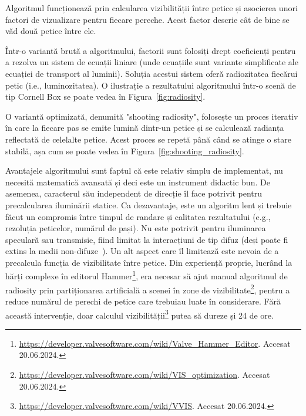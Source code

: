 \documentclass[12pt,a4paper]{report}
\numberwithin{equation}{section} %
\begin{document}
Algoritmul funcționează prin calcularea vizibilității între petice și asocierea
unori factori de vizualizare pentru fiecare pereche. Acest factor descrie
cât de bine se văd două petice între ele.

Într-o variantă brută a algoritmului, factorii sunt folosiți drept coeficienți pentru a rezolva
un sistem de ecuații liniare (unde ecuațiile sunt variante simplificate ale ecuației
de transport al luminii). Soluția acestui sistem oferă radiozitatea fiecărui petic
(i.e., luminozitatea). O ilustrație a rezultatului algoritmului într-o scenă
de tip Cornell Box se poate vedea în Figura~\ref{fig:radiosity}.

O variantă optimizată, denumită "shooting radiosity", folosește un proces iterativ în
care la fiecare pas se emite lumină dintr-un petice și se calculează radianța
reflectată de celelalte petice. Acest proces se repetă până când se atinge o stare
stabilă, așa cum se poate vedea în Figura~\ref{fig:shooting_radiosity}.

Avantajele algoritmului sunt faptul că este relativ simplu de implementat, nu necesită
matematică avansată și deci este un instrument didactic bun. De asemenea, caracterul
său independent de direcție îl face potrivit pentru precalcularea iluminării statice.
Ca dezavantaje, este un algoritm lent și trebuie făcut un compromis între timpul de
randare și calitatea rezultatului (e.g., rezoluția peticelor, numărul de pași). Nu este
potrivit pentru iluminarea speculară sau transmisie, fiind limitat la interacțiuni de tip difuz
(deși poate fi extins la medii non-difuze~\cite{Immel}).
Un alt aspect care îl limitează este nevoia de a precalcula funcția de vizibilitate între petice.
Din experiență proprie, lucrând la hărți complexe în editorul Hammer\footnote{\url{https://developer.valvesoftware.com/wiki/Valve_Hammer_Editor}. Accesat 20.06.2024.},
era necesar să ajut manual algoritmul de radiosity prin partiționarea artificială a
scenei în zone de vizibilitate\footnote{\url{https://developer.valvesoftware.com/wiki/VIS_optimization}. Accesat 20.06.2024.}, pentru a reduce numărul de perechi de petice care
trebuiau luate în considerare. Fără această intervenție, doar calculul vizibilității\footnote{\url{https://developer.valvesoftware.com/wiki/VVIS}. Accesat 20.06.2024.}
putea să dureze și 24 de ore.
\end{document}
